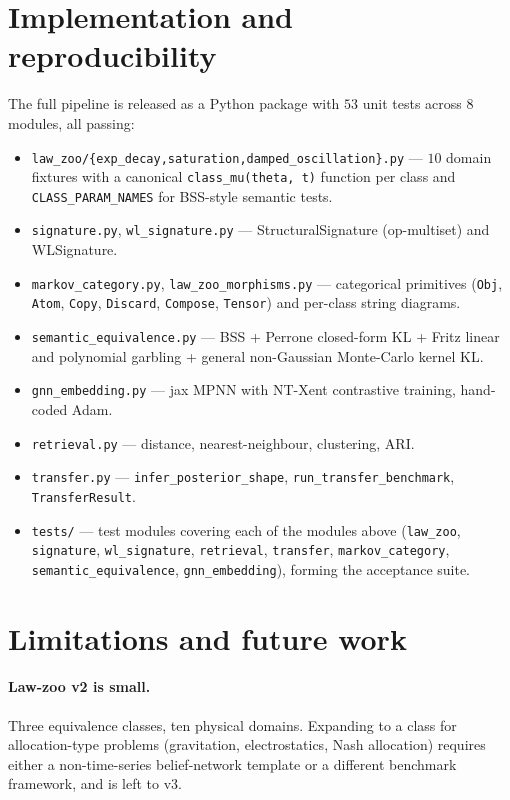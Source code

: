 \documentclass{article}
\begin{document}
\section{Implementation and reproducibility}
\label{sec:impl}

The full pipeline is released as a Python package with $53$ unit tests
across $8$ modules, all passing:

\begin{itemize}[leftmargin=*, itemsep=0pt]
\item \texttt{law\_zoo/\{exp\_decay,saturation,damped\_oscillation\}.py} --- $10$
  domain fixtures with a canonical \texttt{class\_mu(theta, t)}
  function per class and \texttt{CLASS\_PARAM\_NAMES} for BSS-style
  semantic tests.
\item \texttt{signature.py}, \texttt{wl\_signature.py} ---
  StructuralSignature (op-multiset) and WLSignature.
\item \texttt{markov\_category.py}, \texttt{law\_zoo\_morphisms.py}
  --- categorical primitives (\texttt{Obj}, \texttt{Atom},
  \texttt{Copy}, \texttt{Discard}, \texttt{Compose}, \texttt{Tensor})
  and per-class string diagrams.
\item \texttt{semantic\_equivalence.py} --- BSS + Perrone
  closed-form KL + Fritz linear and polynomial garbling + general
  non-Gaussian Monte-Carlo kernel KL.
\item \texttt{gnn\_embedding.py} --- jax MPNN with NT-Xent contrastive
  training, hand-coded Adam.
\item \texttt{retrieval.py} --- distance, nearest-neighbour,
  clustering, ARI.
\item \texttt{transfer.py} --- \texttt{infer\_posterior\_shape},
  \texttt{run\_transfer\_benchmark}, \texttt{TransferResult}.
\item \texttt{tests/} --- test modules covering each of the modules
  above (\texttt{law\_zoo}, \texttt{signature}, \texttt{wl\_signature},
  \texttt{retrieval}, \texttt{transfer}, \texttt{markov\_category},
  \texttt{semantic\_equivalence}, \texttt{gnn\_embedding}), forming
  the acceptance suite.
\end{itemize}

\section{Limitations and future work}
\label{sec:limitations}

\paragraph{Law-zoo v2 is small.} Three equivalence classes, ten
physical domains. Expanding to a class for allocation-type problems
(gravitation, electrostatics, Nash allocation) requires either a
non-time-series belief-network template or a different benchmark
framework, and is left to v3.
\end{document}
